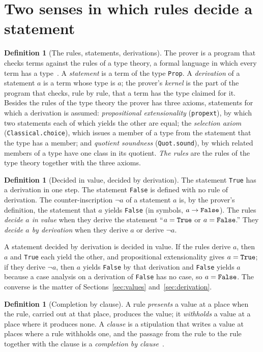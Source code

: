 \documentclass[11pt]{article}
\theoremstyle{definition}
\newtheorem{definition}[theorem]{Definition}
\theoremstyle{remark}
\DeclareRobustCommand{\lean}[1]{{\renewcommand{\_}{\textunderscore\allowbreak}\texttt{#1}}}
\newcommand{\True}{\lean{True}}
\newcommand{\False}{\lean{False}}
\begin{document}
\section{Two senses in which rules decide a statement}\label{sec:two}

\begin{definition}[The rules, statements, derivations]\label{def:rules}
The prover is a program that checks terms against the rules of a type theory, a formal language in which every term has a type~\citep{lean4,carneiro}. A \emph{statement} is a term of the type \lean{Prop}. A \emph{derivation} of a statement $a$ is a term whose type is $a$; the prover's \emph{kernel} is the part of the program that checks, rule by rule, that a term has the type claimed for it. Besides the rules of the type theory the prover has three axioms, statements for which a derivation is assumed: \emph{propositional extensionality} (\lean{propext}), by which two statements each of which yields the other are equal; the \emph{selection axiom} (\lean{Classical.choice}), which issues a member of a type from the statement that the type has a member; and \emph{quotient soundness} (\lean{Quot.sound}), by which related members of a type have one class in its quotient. \emph{The rules} are the rules of the type theory together with the three axioms.
\end{definition}

\begin{definition}[Decided in value, decided by derivation]\label{def:decided}
The statement \True{} has a derivation in one step. The statement \False{} is defined with no rule of derivation. The counter-inscription $\neg a$ of a statement $a$ is, by the prover's definition, the statement that $a$ yields \False{} (in symbols, $a\to\False$). The rules \emph{decide $a$ in value} when they derive the statement ``$a=\True$ or $a=\False$.'' They \emph{decide $a$ by derivation} when they derive $a$ or derive $\neg a$.
\end{definition}

A statement decided by derivation is decided in value. If the rules derive $a$, then $a$ and \True{} each yield the other, and propositional extensionality gives $a=\True$; if they derive $\neg a$, then $a$ yields \False{} by that derivation and \False{} yields $a$ because a case analysis on a derivation of \False{} has no case, so $a=\False$. The converse is the matter of Sections~\ref{sec:values} and~\ref{sec:derivation}.

\begin{definition}[Completion by clause]\label{def:clause}
A rule \emph{presents} a value at a place when the rule, carried out at that place, produces the value; it \emph{withholds} a value at a place where it produces none. A \emph{clause} is a stipulation that writes a value at places where a rule withholds one, and the passage from the rule to the rule together with the clause is a \emph{completion by clause}~\citep{tv}.
\end{definition}
\end{document}

